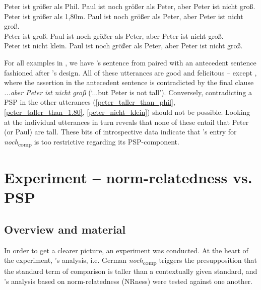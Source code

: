 \documentclass[output=paper
,modfonts
,nonflat]{langsci/langscibook}
\begin{document}
\ea \label{ub_hs_all} \ea Peter ist größer als Phil. Paul ist noch größer als Peter, aber Peter ist nicht groß.\label{peter_taller_than_phil} \\ 
\ex Peter ist größer als 1,80m.  Paul ist noch größer als Peter, aber Peter ist nicht groß.\label{peter_taller_than_1.80}\\ 
\ex *Peter ist groß. Paul ist noch größer als Peter, aber Peter ist nicht groß.\label{peter_tall}\\ 
\ex Peter ist nicht klein. Paul ist noch größer als Peter, aber Peter ist nicht groß.\label{peter_nicht_klein}\\
\z\z

For all examples in , we have \citeauthor{Hofstetter2013}'s sentence from  paired with an antecedent sentence fashioned after \citeauthor{umbach2009a_comp}'s design. All of these utterances are good and felicitous -- except , where the assertion in the antecedent sentence is contradicted by the final clause \textit{...aber Peter ist nicht groß} (`...but Peter is not tall'). Conversely, contradicting a PSP in the other utterances (\ref{peter_taller_than_phil}, \ref{peter_taller_than_1.80}, \ref{peter_nicht_klein}) should not be possible. Looking at the individual utterances in turn reveals that none of these entail that Peter (or Paul) are tall. These bits of introspective data indicate that \citeauthor{Hofstetter2013}'s entry for \textit{noch}\textsubscript{comp} is too restrictive regarding its PSP-component. 


\section{Experiment -- norm-relatedness vs. PSP}\label{sec_experiment}
\subsection{Overview and material}

In order to get a clearer picture, an experiment was conducted. At the heart of the experiment, \citeauthor{Hofstetter2013}'s \citeyearpar{Hofstetter2013} analysis, i.e. German \textit{noch}\textsubscript{comp} triggers the presupposition that the standard term of comparison is taller than a contextually given standard, and \citeauthor{umbach2009a_comp}'s \citeyearpar{umbach2009a_comp} analysis based on norm-relatedness (NRness) were tested against one another.
\end{document}
